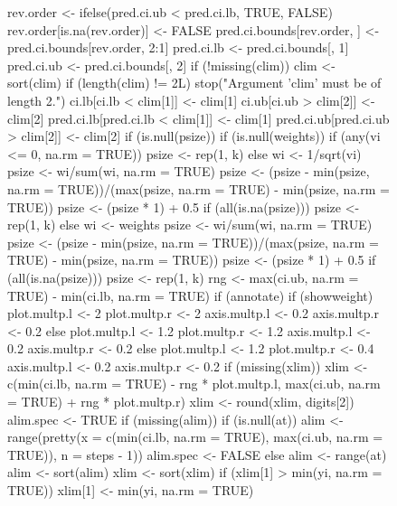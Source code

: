 \documentclass[11pt, a4paper]{article}
\begin{document}
\begin{figure}
{\begin{Schunk}
\begin{Soutput}
{    rev.order <- ifelse(pred.ci.ub < pred.ci.lb, TRUE, FALSE)
    rev.order[is.na(rev.order)] <- FALSE
    pred.ci.bounds[rev.order, ] <- pred.ci.bounds[rev.order, 
        2:1]
    pred.ci.lb <- pred.ci.bounds[, 1]
    pred.ci.ub <- pred.ci.bounds[, 2]
    if (!missing(clim)) {
        clim <- sort(clim)
        if (length(clim) != 2L) 
            stop("Argument 'clim' must be of length 2.")
        ci.lb[ci.lb < clim[1]] <- clim[1]
        ci.ub[ci.ub > clim[2]] <- clim[2]
        pred.ci.lb[pred.ci.lb < clim[1]] <- clim[1]
        pred.ci.ub[pred.ci.ub > clim[2]] <- clim[2]
    }
    if (is.null(psize)) {
        if (is.null(weights)) {
            if (any(vi <= 0, na.rm = TRUE)) {
                psize <- rep(1, k)
            }
            else {
                wi <- 1/sqrt(vi)
                psize <- wi/sum(wi, na.rm = TRUE)
                psize <- (psize - min(psize, na.rm = TRUE))/(max(psize, 
                  na.rm = TRUE) - min(psize, na.rm = TRUE))
                psize <- (psize * 1) + 0.5
                if (all(is.na(psize))) 
                  psize <- rep(1, k)
            }
        }
        else {
            wi <- weights
            psize <- wi/sum(wi, na.rm = TRUE)
            psize <- (psize - min(psize, na.rm = TRUE))/(max(psize, 
                na.rm = TRUE) - min(psize, na.rm = TRUE))
            psize <- (psize * 1) + 0.5
            if (all(is.na(psize))) 
                psize <- rep(1, k)
        }
    }
    rng <- max(ci.ub, na.rm = TRUE) - min(ci.lb, na.rm = TRUE)
    if (annotate) {
        if (showweight) {
            plot.multp.l <- 2
            plot.multp.r <- 2
            axis.multp.l <- 0.2
            axis.multp.r <- 0.2
        }
        else {
            plot.multp.l <- 1.2
            plot.multp.r <- 1.2
            axis.multp.l <- 0.2
            axis.multp.r <- 0.2
        }
    }
    else {
        plot.multp.l <- 1.2
        plot.multp.r <- 0.4
        axis.multp.l <- 0.2
        axis.multp.r <- 0.2
    }
    if (missing(xlim)) {
        xlim <- c(min(ci.lb, na.rm = TRUE) - rng * plot.multp.l, 
            max(ci.ub, na.rm = TRUE) + rng * plot.multp.r)
        xlim <- round(xlim, digits[2])
    }
    alim.spec <- TRUE
    if (missing(alim)) {
        if (is.null(at)) {
            alim <- range(pretty(x = c(min(ci.lb, na.rm = TRUE), 
                max(ci.ub, na.rm = TRUE)), n = steps - 1))
            alim.spec <- FALSE
        }
        else {
            alim <- range(at)
        }
    }
    alim <- sort(alim)
    xlim <- sort(xlim)
    if (xlim[1] > min(yi, na.rm = TRUE)) {
        xlim[1] <- min(yi, na.rm = TRUE)
}}
\end{Soutput}
\end{Schunk}}
\end{figure}
\end{document}
